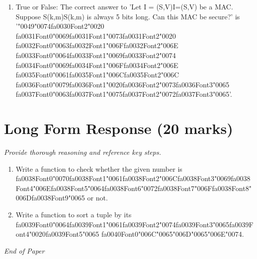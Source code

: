 \documentclass[12pt]{article}
\begin{document}
\begin{enumerate}[label=\arabic*.]
\item True or False: The correct answer to 'Let I = (S,V)I=(S,V) be a MAC. Suppose S(k,m)S(k,m) is always 5 bits long. Can this MAC be secure?' is '{\char"0049}{\char"0074}{\csname fa0030Font2\endcsname\char"0020} {\csname fa0031Font0\endcsname\char"0069}{\csname fa0031Font1\endcsname\char"0073}{\csname fa0031Font2\endcsname\char"0020} {\csname fa0032Font0\endcsname\char"0063}{\csname fa0032Font1\endcsname\char"006F}{\csname fa0032Font2\endcsname\char"006E} {\csname fa0033Font0\endcsname\char"0064}{\csname fa0033Font1\endcsname\char"0069}{\csname fa0033Font2\endcsname\char"0074} {\csname fa0034Font0\endcsname\char"0069}{\csname fa0034Font1\endcsname\char"006F}{\csname fa0034Font2\endcsname\char"006E} {\csname fa0035Font0\endcsname\char"0061}{\csname fa0035Font1\endcsname\char"006C}{\csname fa0035Font2\endcsname\char"006C} {\csname fa0036Font0\endcsname\char"0079}{\csname fa0036Font1\endcsname\char"0020}{\csname fa0036Font2\endcsname\char"0073}{\csname fa0036Font3\endcsname\char"0065} {\csname fa0037Font0\endcsname\char"0063}{\csname fa0037Font1\endcsname\char"0075}{\csname fa0037Font2\endcsname\char"0072}{\csname fa0037Font3\endcsname\char"0065}'.
\end{enumerate}

\section*{Long Form Response (20 marks)}
\textit{Provide thorough reasoning and reference key steps.}
\begin{enumerate}[label=\arabic*.]
\item Write a function to check whether the given number is {\csname fa0038Font0\endcsname\char"0070}{\csname fa0038Font1\endcsname\char"0061}{\csname fa0038Font2\endcsname\char"006C}{\csname fa0038Font3\endcsname\char"0069}{\csname fa0038Font4\endcsname\char"006E}{\csname fa0038Font5\endcsname\char"0064}{\csname fa0038Font6\endcsname\char"0072}{\csname fa0038Font7\endcsname\char"006F}{\csname fa0038Font8\endcsname\char"006D}{\csname fa0038Font9\endcsname\char"0065} or not.
\item Write a function to sort a tuple by its {\csname fa0039Font0\endcsname\char"0064}{\csname fa0039Font1\endcsname\char"0061}{\csname fa0039Font2\endcsname\char"0074}{\csname fa0039Font3\endcsname\char"0065}{\csname fa0039Font4\endcsname\char"0020}{\csname fa0039Font5\endcsname\char"0065} {\csname fa0040Font0\endcsname\char"006C}{\char"0065}{\char"006D}{\char"0065}{\char"006E}{\char"0074}.
\end{enumerate}

\vfill
\noindent\textit{End of Paper}
\end{document}
